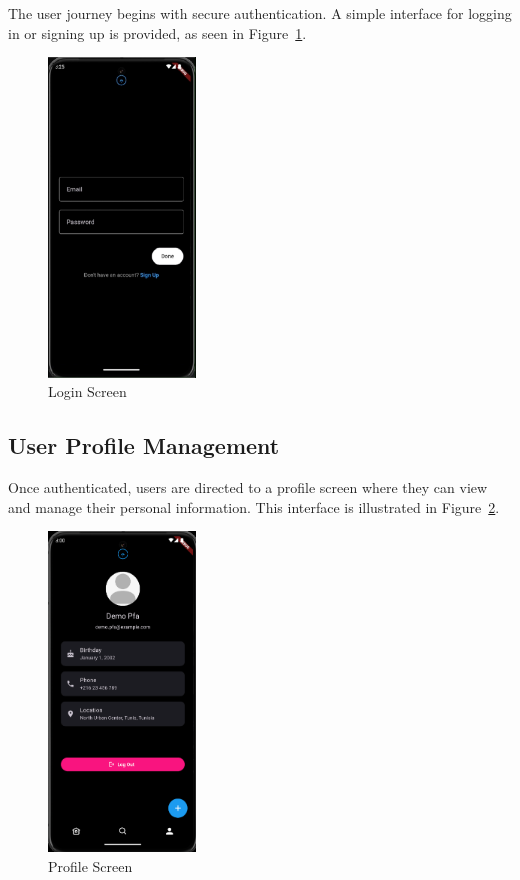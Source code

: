 The user journey begins with secure authentication. A simple interface for logging in or signing up is provided, as seen in Figure~\ref{fig:login_screen}.

\begin{figure}[H]
    \centering
    \includegraphics[width=0.35\textwidth]{images/UI_Screenshots/login_screen.png}
    \caption{Login Screen}
    \label{fig:login_screen}
\end{figure}

\subsection{User Profile Management}

Once authenticated, users are directed to a profile screen where they can view and manage their personal information. This interface is illustrated in Figure~\ref{fig:profile_screen}.

\begin{figure}[H]
    \centering
    \includegraphics[width=0.35\textwidth]{images/UI_Screenshots/profile_screen.png}
    \caption{Profile Screen}
    \label{fig:profile_screen}
\end{figure}

